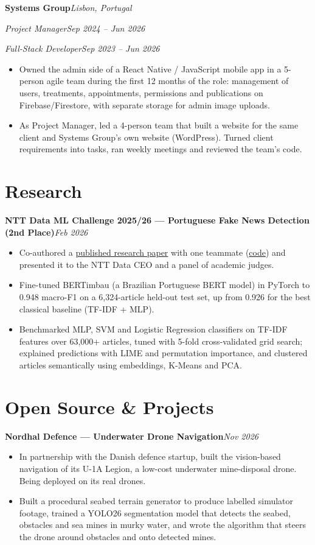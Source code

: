 \documentclass[11pt,a4paper]{article}
\newcommand{\entry}[2]{\Needspace{5\baselineskip}\textbf{#1}\hfill\textit{#2}\par\nopagebreak}
\newcommand{\role}[2]{\textit{#1}\hfill\textit{#2}\par\nopagebreak}
\begin{document}
\entry{Systems Group}{Lisbon, Portugal}
\role{Project Manager}{Sep 2024 -- Jun 2026}
\role{Full-Stack Developer}{Sep 2023 -- Jun 2026}
\begin{itemize}
    \item Owned the admin side of a React Native / JavaScript mobile app in a 5-person agile team during the first 12 months of the role: management of users, treatments, appointments, permissions and publications on Firebase/Firestore, with separate storage for admin image uploads.
    \item As Project Manager, led a 4-person team that built a website for the same client and Systems Group's own website (WordPress). Turned client requirements into tasks, ran weekly meetings and reviewed the team's code.
\end{itemize}

\section*{Research}
\entry{NTT Data ML Challenge 2025/26 --- Portuguese Fake News Detection (2nd Place)}{Feb 2026}
\begin{itemize}
    \item Co-authored a \href{https://zenodo.org/records/18393436}{published research paper} with one teammate (\href{https://github.com/DuarteCruz6/pt-fake-news-detection}{code}) and presented it to the NTT Data CEO and a panel of academic judges.
    \item Fine-tuned BERTimbau (a Brazilian Portuguese BERT model) in PyTorch to 0.948 macro-F1 on a 6,324-article held-out test set, up from 0.926 for the best classical baseline (TF-IDF + MLP).
    \item Benchmarked MLP, SVM and Logistic Regression classifiers on TF-IDF features over 63,000+ articles, tuned with 5-fold cross-validated grid search; explained predictions with LIME and permutation importance, and clustered articles semantically using embeddings, K-Means and PCA.
\end{itemize}

\section*{Open Source \& Projects}
\entry{Nordhal Defence --- Underwater Drone Navigation}{Nov 2026}
\begin{itemize}
    \item In partnership with the Danish defence startup, built the vision-based navigation of its U-1A Legion, a low-cost underwater mine-disposal drone. Being deployed on its real drones.
    \item Built a procedural seabed terrain generator to produce labelled simulator footage, trained a YOLO26 segmentation model that detects the seabed, obstacles and sea mines in murky water, and wrote the algorithm that steers the drone around obstacles and onto detected mines.
\end{itemize}
\end{document}
